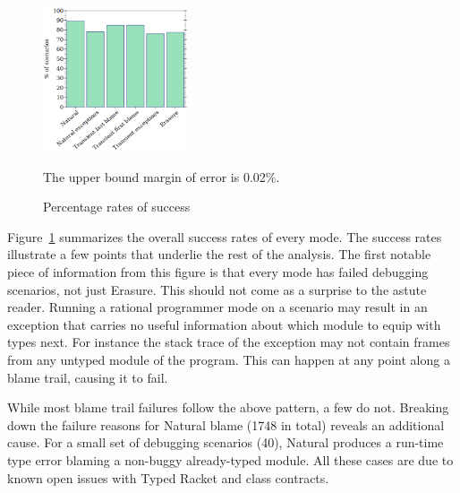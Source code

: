 
\begin{figure} \footnotesize 
  \vspace{-1.5em}
  \includegraphics[width=0.38\textwidth]{./plots/success-bars}
  \vspace{1em}
  \begin{minipage}{0.35\textwidth} \raggedright
   The upper bound margin of error is 0.02\%.
  \end{minipage}
\vspace{-2em}
  \caption{Percentage rates of success} \label{fig:success-bars}
\end{figure}



Figure~\ref{fig:success-bars} summarizes the overall success rates of
every mode.
The success rates illustrate a few points that underlie the
rest of the analysis.  The first notable piece of information from this
figure is that every mode has failed debugging scenarios, not just
Erasure. This should not come as a surprise to the astute reader.  Running
a rational programmer mode on a scenario may result in an exception
that carries no useful information about which module to equip with types next. For instance the stack trace of the exception may not
contain frames from any untyped module of the program. This can happen at any point
along a blame trail, causing it to fail.

While most blame trail failures follow the above pattern, a few do
not.  Breaking down the failure reasons for Natural blame (1748 in
total) reveals an additional cause. For a small set of debugging scenarios
(40), Natural produces a run-time type error blaming a non-buggy
already-typed module. All these cases are due to known open issues with Typed
Racket and class contracts. 

